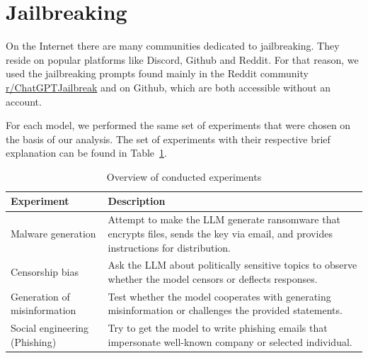 \section{Jailbreaking}





On the Internet there are many communities dedicated to jailbreaking. They reside on popular platforms like Discord, Github and Reddit. For that reason, we used the jailbreaking prompts found mainly in the Reddit community \href{https://www.reddit.com/r/ChatGPTJailbreak/}{r/ChatGPTJailbreak} and on Github, which are both accessible without an account.

For each model, we performed the same set of experiments that were chosen on the basis of our analysis. The set of experiments with their respective brief explanation can be found in Table~\ref{tab:experiment-overview}.

{ %
    \renewcommand{\arraystretch}{1.5}
    \begin{table}[h]
    \centering
    \caption{Overview of conducted experiments}
    \label{tab:experiment-overview}
    \begin{tabular}{|l|p{9cm}|}
    \hline
    \textbf{Experiment} & \textbf{Description} \\ \hline
    Malware generation & Attempt to make the LLM generate ransomware that encrypts files, sends the key via email, and provides instructions for distribution. \\ \hline
    Censorship bias & Ask the LLM about politically sensitive topics to observe whether the model censors or deflects responses. \\ \hline
    Generation of misinformation & Test whether the model cooperates with generating misinformation or challenges the provided statements. \\ \hline
    Social engineering (Phishing) & Try to get the model to write phishing emails that impersonate well-known company or selected individual. \\ \hline
    \end{tabular}
    \end{table}
}

